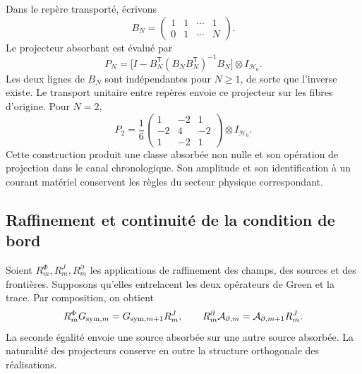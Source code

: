 Dans le repère transporté, écrivons
\[
 B_N=\begin{pmatrix}1&1&\cdots&1\\0&1&\cdots&N\end{pmatrix}.
\]
Le projecteur absorbant est évalué par
\begin{equation}
 P_N=\bigl[I-B_N^{\mathsf T}(B_NB_N^{\mathsf T})^{-1}B_N\bigr]
       \otimes I_{\mathcal H_0}.
 \label{vii:eq:proyector-momentos-cronologicos}
\end{equation}
Les deux lignes de \(B_N\) sont indépendantes pour \(N\geq1\), de sorte que l'inverse existe. Le transport unitaire entre repères envoie ce projecteur sur les fibres d'origine. Pour \(N=2\),
\[
 P_2=\frac16
 \begin{pmatrix}1&-2&1\\-2&4&-2\\1&-2&1\end{pmatrix}
 \otimes I_{\mathcal H_0}.
\]
Cette construction produit une classe absorbée non nulle et son opération de
projection dans le canal chronologique. Son amplitude et son identification à un
courant matériel conservent les règles du secteur physique correspondant.

\subsection{Raffinement et continuité de la condition de bord}
\label{vii:subsec:refinamiento-absorcion}

Soient \(R_m^\Phi,R_m^J,R_m^\partial\) les applications de raffinement des
champs, des sources et des frontières. Supposons qu'elles entrelacent les deux opérateurs de Green et la
trace. Par composition, on obtient
\begin{equation}
 R_m^\Phi G_{{\rm sym},m}=G_{{\rm sym},m+1}R_m^J,\qquad
 R_m^\partial\mathcal A_{\partial,m}
 =\mathcal A_{\partial,m+1}R_m^J.
 \label{vii:eq:refinamiento-lectura-absorcion}
\end{equation}
La seconde égalité envoie une source absorbée sur une autre source absorbée.
La naturalité des projecteurs conserve en outre la structure
orthogonale des réalisations.

